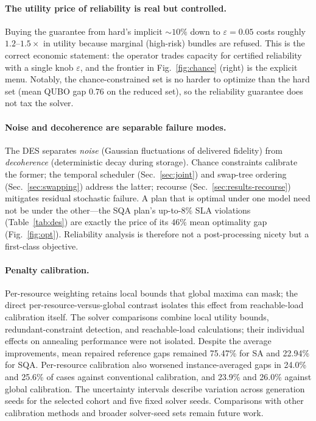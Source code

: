 \documentclass[twocolumn]{article}
\begin{document}
\paragraph{The utility price of reliability is real but
controlled.}  Buying the guarantee from hard's implicit $\sim\!10\%$
down to $\varepsilon=0.05$ costs roughly $1.2$--$1.5\times$ in utility
because marginal (high-risk) bundles are refused.  This is the correct
economic statement: the operator trades capacity for certified
reliability with a single knob $\varepsilon$, and the frontier in
Fig.~\ref{fig:chance} (right) is the explicit menu.  Notably, the
chance-constrained set is no harder to optimize than the hard set
(mean QUBO gap $0.76$ on the reduced set), so the reliability
guarantee does not tax the solver.

\paragraph{Noise and decoherence are separable failure modes.}
The DES separates \emph{noise} (Gaussian fluctuations of delivered
fidelity) from \emph{decoherence} (deterministic decay during
storage).  Chance constraints calibrate the former; the temporal
scheduler (Sec.~\ref{sec:joint}) and swap-tree ordering
(Sec.~\ref{sec:swapping}) address the latter; recourse
(Sec.~\ref{sec:results-recourse}) mitigates residual stochastic
failure.  A plan that is optimal under one model need not be under the
other---the SQA plan's up-to-$8\%$ SLA violations (Table~\ref{tab:des})
are exactly the price of its $46\%$ mean optimality gap
(Fig.~\ref{fig:opt}).  Reliability analysis is therefore not a
post-processing nicety but a first-class objective.

\paragraph{Penalty calibration.}
Per-resource weighting retains local bounds that global maxima can
mask; the direct per-resource-versus-global contrast isolates this
effect from reachable-load calibration itself.  The solver comparisons combine local utility bounds,
redundant-constraint detection, and reachable-load calculations;
their individual effects on annealing performance were not isolated.
Despite the average improvements, mean repaired reference gaps
remained 75.47\% for SA and 22.94\% for SQA.  Per-resource calibration
also worsened instance-averaged gaps in 24.0\% and 25.6\% of cases
against conventional calibration, and 23.9\% and 26.0\% against
global calibration.  The uncertainty intervals describe variation across
generation seeds for the selected cohort and five fixed solver
seeds.  Comparisons with other calibration methods and broader
solver-seed sets remain future work.
\end{document}
